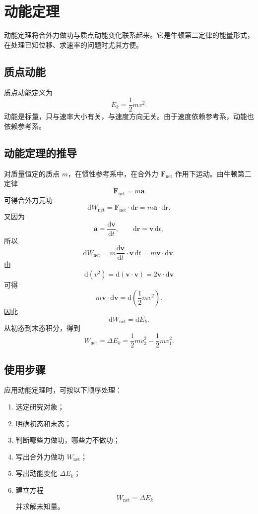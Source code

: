 \newpage

\section{动能定理}

动能定理将合外力做功与质点动能变化联系起来。它是牛顿第二定律的能量形式，在处理已知位移、求速率的问题时尤其方便。

\subsection{质点动能}

质点动能定义为
\[
    \boxed{
    E_k=\frac{1}{2}mv^2
    } .
\]
动能是标量，只与速率大小有关，与速度方向无关。由于速度依赖参考系，动能也依赖参考系。

\subsection{动能定理的推导}

对质量恒定的质点 $m$，在惯性参考系中，在合外力 $\boldsymbol F_{\mathrm{net}}$ 作用下运动。由牛顿第二定律
\[
    \boldsymbol F_{\mathrm{net}}=m\boldsymbol a
\]
可得合外力元功
\[
    \mathrm dW_{\mathrm{net}}
    =
    \boldsymbol F_{\mathrm{net}}\cdot\mathrm d\boldsymbol r
    =
    m\boldsymbol a\cdot\mathrm d\boldsymbol r .
\]
又因为
\[
    \boldsymbol a=\frac{\mathrm d\boldsymbol v}{\mathrm dt},
    \qquad
    \mathrm d\boldsymbol r=\boldsymbol v\,\mathrm dt,
\]
所以
\[
    \mathrm dW_{\mathrm{net}}
    =
    m\frac{\mathrm d\boldsymbol v}{\mathrm dt}\cdot\boldsymbol v\,\mathrm dt
    =
    m\boldsymbol v\cdot\mathrm d\boldsymbol v .
\]
由
\[
    \mathrm d(v^2)
    =
    \mathrm d(\boldsymbol v\cdot\boldsymbol v)
    =
    2\boldsymbol v\cdot\mathrm d\boldsymbol v
\]
可得
\[
    m\boldsymbol v\cdot\mathrm d\boldsymbol v
    =
    \mathrm d\left(\frac{1}{2}mv^2\right).
\]
因此
\[
    \mathrm dW_{\mathrm{net}}=\mathrm dE_k.
\]
从初态到末态积分，得到
\[
    \boxed{
    W_{\mathrm{net}}
    =
    \Delta E_k
    =
    \frac{1}{2}mv_2^2-\frac{1}{2}mv_1^2
    } .
\]

\subsection{使用步骤}

应用动能定理时，可按以下顺序处理：

\begin{enumerate}
    \item 选定研究对象；
    \item 明确初态和末态；
    \item 判断哪些力做功，哪些力不做功；
    \item 写出合外力做功 $W_{\mathrm{net}}$；
    \item 写出动能变化 $\Delta E_k$；
    \item 建立方程
    \[
        W_{\mathrm{net}}=\Delta E_k
    \]
    并求解未知量。
\end{enumerate}


